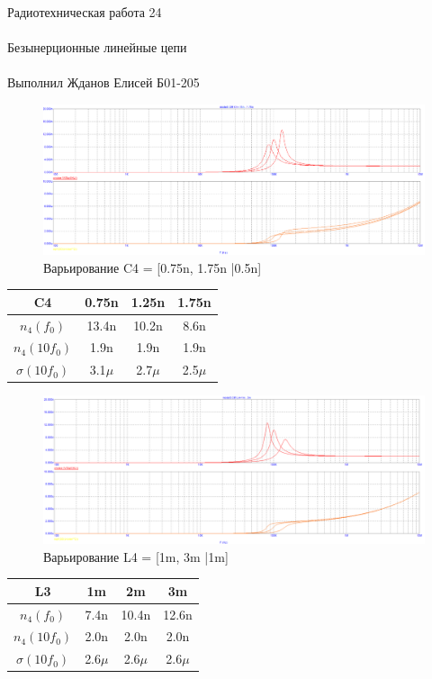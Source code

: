\documentclass{astroedu-lab}
\begin{document}
\begin{problem}{\huge Радиотехническая работа 24\\\\Безынерционные линейные цепи\\\\Выполнил Жданов Елисей Б01-205}
\begin{enumerate}
\begin{figure}[h!]
    \centering
    \includegraphics[scale=0.3]{images/mod3_4_2_2.png}
    \caption{Варьирование C4 = [0.75n, 1.75n |0.5n]}
    \label{fig:m3422}
\end{figure}

\begin{center}
\begin{tabular}{|c|c|c|c|}
\hline
    C4 & 0.75n & 1.25n & 1.75n\\ \hline
    $n_4(f_0)$ & 13.4n & 10.2n & 8.6n\\ \hline
    $n_4(10 f_0)$ & 1.9n & 1.9n & 1.9n \\ \hline
    $\sigma(10 f_0)$ & 3.1$\mu$ & 2.7$\mu$ & 2.5$\mu$\\ \hline
\end{tabular}
\end{center}

\begin{figure}[h!]
    \centering
    \includegraphics[scale=0.3]{images/mod3_4_2_3.png}
    \caption{Варьирование L4 = [1m, 3m |1m]}
    \label{fig:m3423}
\end{figure}

\begin{center}
\begin{tabular}{|c|c|c|c|}
\hline
    L3 & 1m & 2m & 3m\\ \hline
    $n_4(f_0)$ & 7.4n & 10.4n & 12.6n\\ \hline
    $n_4(10 f_0)$ & 2.0n & 2.0n & 2.0n \\ \hline
    $\sigma(10 f_0)$ & 2.6$\mu$ & 2.6$\mu$ & 2.6$\mu$ \\ \hline
\end{tabular}
\end{center}


\end{enumerate}
\end{problem}
\end{document}
